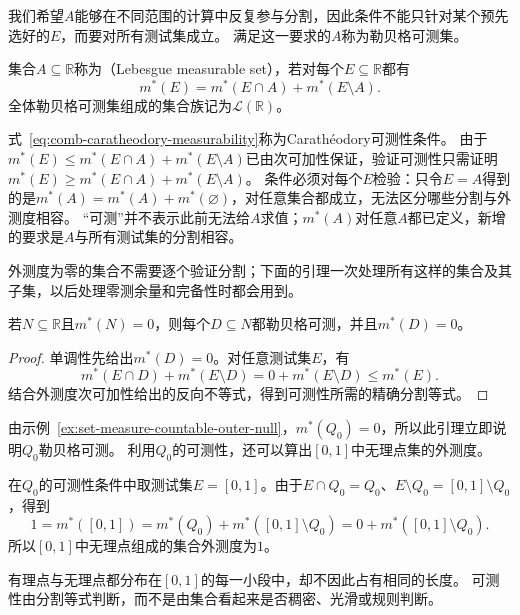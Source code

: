 我们希望$A$能够在不同范围的计算中反复参与分割，因此条件不能只针对某个预先选好的$E$，而要对所有测试集成立。
满足这一要求的$A$称为勒贝格可测集。
\begin{definition}[勒贝格可测集]
\label{def:analysis-lebesgue-measurable-set}
集合$A\subseteq\mathbb R$称为（Lebesgue measurable set），若对每个$E\subseteq\mathbb R$都有
\begin{equation}
 m^*(E)=m^*(E\cap A)+m^*(E\setminus A).
 \label{eq:comb-caratheodory-measurability}
\end{equation}
全体勒贝格可测集组成的集合族记为$\mathcal L(\mathbb R)$。
\end{definition}

式~\eqref{eq:comb-caratheodory-measurability}称为Carathéodory可测性条件。
由于$m^*(E)\leq m^*(E\cap A)+m^*(E\setminus A)$已由次可加性保证，验证可测性只需证明
$m^*(E)\geq m^*(E\cap A)+m^*(E\setminus A)$。
条件必须对每个$E$检验：只令$E=A$得到的是$m^*(A)=m^*(A)+m^*(\varnothing)$，对任意集合都成立，无法区分哪些分割与外测度相容。
“可测”并不表示此前无法给$A$求值；$m^*(A)$对任意$A$都已定义，新增的要求是$A$与所有测试集的分割相容。

外测度为零的集合不需要逐个验证分割；下面的引理一次处理所有这样的集合及其子集，以后处理零测余量和完备性时都会用到。
\begin{lemma}[零外测度集的子集可测]
\label{lem:analysis-zero-outer-measure-measurable}
若$N\subseteq\mathbb R$且$m^*(N)=0$，则每个$D\subseteq N$都勒贝格可测，并且$m^*(D)=0$。
\end{lemma}
\begin{proof}
单调性先给出$m^*(D)=0$。对任意测试集$E$，有
\[
 m^*(E\cap D)+m^*(E\setminus D)=0+m^*(E\setminus D)\leq m^*(E).
\]
结合外测度次可加性给出的反向不等式，得到可测性所需的精确分割等式。
\end{proof}

由示例~\ref{ex:set-measure-countable-outer-null}，$m^*(Q_0)=0$，所以此引理立即说明$Q_0$勒贝格可测。
利用$Q_0$的可测性，还可以算出$[0,1]$中无理点集的外测度。
\begin{example}[单位区间中无理点的外测度]
\label{ex:set-measure-irrationals-outer-measure}
在$Q_0$的可测性条件中取测试集$E=[0,1]$。由于$E\cap Q_0=Q_0$、$E\setminus Q_0=[0,1]\setminus Q_0$，得到
\[
 1=m^*([0,1])=m^*(Q_0)+m^*([0,1]\setminus Q_0)=0+m^*([0,1]\setminus Q_0).
\]
所以$[0,1]$中无理点组成的集合外测度为$1$。
\end{example}

有理点与无理点都分布在$[0,1]$的每一小段中，却不因此占有相同的长度。
可测性由分割等式判断，而不是由集合看起来是否稠密、光滑或规则判断。

